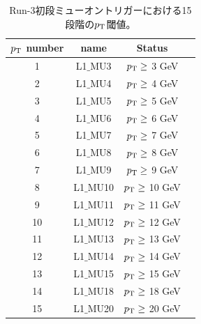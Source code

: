 \begin{table}[]
    \caption{Run-3初段ミューオントリガーにおける15段階の$p_{\rm{T}}$閾値\cite{article:shiomi-mron}。}
    \label{pt_number}
    \centering
    \begin{tabular}{|c|c|c|c|}
        \hline
        $p_{\rm{T}}$ number & name & Status\\
        \hline
        1 & L1$\_$MU3 & $p_{\rm{T}} \geq$ 3 GeV \\
        \hline
        2 & L1$\_$MU4 & $p_{\rm{T}} \geq$ 4 GeV \\
        \hline
        3 & L1$\_$MU5 & $p_{\rm{T}} \geq$ 5 GeV \\
        \hline
        4 & L1$\_$MU6 & $p_{\rm{T}} \geq$ 6 GeV \\
        \hline
        5 & L1$\_$MU7 & $p_{\rm{T}} \geq$ 7 GeV \\
        \hline
        6 & L1$\_$MU8 & $p_{\rm{T}} \geq$ 8 GeV \\
        \hline
        7 & L1$\_$MU9 & $p_{\rm{T}} \geq$ 9 GeV \\
        \hline
        8 & L1$\_$MU10 & $p_{\rm{T}} \geq$ 10 GeV \\
        \hline
        9 & L1$\_$MU11 & $p_{\rm{T}} \geq$ 11 GeV \\
        \hline
        10 & L1$\_$MU12 & $p_{\rm{T}} \geq$ 12 GeV \\
        \hline
        11 & L1$\_$MU13 & $p_{\rm{T}} \geq$ 13 GeV \\
        \hline
        12 & L1$\_$MU14 & $p_{\rm{T}} \geq$ 14 GeV \\
        \hline
        13 & L1$\_$MU15 & $p_{\rm{T}} \geq$ 15 GeV \\
        \hline
        14 & L1$\_$MU18 & $p_{\rm{T}} \geq$ 18 GeV \\
        \hline
        15 & L1$\_$MU20 & $p_{\rm{T}} \geq$ 20 GeV \\
        \hline
    \end{tabular}
\end{table}

